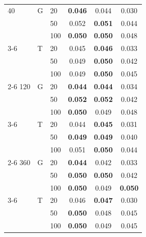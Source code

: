 \documentclass[12pt]{article}
\theoremstyle{plain}
\theoremstyle{remark}
\begin{document}
\begin{table}
\begin{tabular}{lllccc}
		 40 & G  & 20 & \bf 0.046 & 0.044 & 0.030 \\ 
		 & &  50 & 0.052 & \bf 0.051 & 0.044 \\ 
		 & & 100 & \bf 0.050 & \bf 0.050 & 0.048 \\ 
		\cline{3-6}
		 & T & 20 & 0.045 & \bf 0.046 & 0.033 \\ 
		 & &  50 & 0.049 & \bf 0.050 & 0.042 \\ 
		 & & 100 & 0.049 & \bf 0.050 & 0.045 \\ 
		 \cline{2-6}
		 120 & G  & 20 & \bf 0.044 & \bf 0.044 & 0.034 \\ 
		 & &  50 & \bf 0.052 & \bf 0.052 &  0.042 \\ 
		 & & 100 & \bf 0.050 & 0.049 & 0.048  \\ 
		\cline{3-6}
		 & T & 20 & 0.044 & \bf 0.045 & 0.031 \\ 
		 & &  50 & \bf 0.049 & \bf 0.049 &  0.040 \\ 
		 & & 100 & 0.051 & \bf 0.050 &  0.044 \\ 
		 \cline{2-6}
		 360 & G  & 20 & \bf 0.044 & 0.042 & 0.033 \\ 
		 & &  50 & \bf 0.050 & \bf 0.050 & 0.042 \\ 
		 & & 100 & \bf 0.050 & 0.049 & \bf 0.050 \\ 
		\cline{3-6}
		 & T & 20 & 0.046 & \bf 0.047 & 0.030 \\ 
		 & &  50 & \bf 0.050 & 0.048 &  0.045 \\ 
		 & & 100 & \bf 0.050 & 0.049 & 0.045  \\ 
		 \hline
	\end{tabular}
\end{table}
\end{document}
